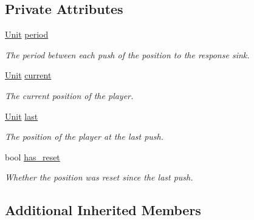 \subsection*{Private Attributes}
\begin{DoxyCompactItemize}
\item 
\hypertarget{classPlayerPosition_a59fceae86a59fb8ad1fb4e93160f948c}{\hyperlink{classPlayerPosition_a535c99057ceca21d8fbe82883c592a66}{Unit} \hyperlink{classPlayerPosition_a59fceae86a59fb8ad1fb4e93160f948c}{period}}\label{classPlayerPosition_a59fceae86a59fb8ad1fb4e93160f948c}

\begin{DoxyCompactList}\small\item\em The period between each push of the position to the response sink. \end{DoxyCompactList}\item 
\hypertarget{classPlayerPosition_a043f477d249cca2eaa00e0e616888bea}{\hyperlink{classPlayerPosition_a535c99057ceca21d8fbe82883c592a66}{Unit} \hyperlink{classPlayerPosition_a043f477d249cca2eaa00e0e616888bea}{current}}\label{classPlayerPosition_a043f477d249cca2eaa00e0e616888bea}

\begin{DoxyCompactList}\small\item\em The current position of the player. \end{DoxyCompactList}\item 
\hypertarget{classPlayerPosition_a4adeb717201c469c16236c2d2d6f9cef}{\hyperlink{classPlayerPosition_a535c99057ceca21d8fbe82883c592a66}{Unit} \hyperlink{classPlayerPosition_a4adeb717201c469c16236c2d2d6f9cef}{last}}\label{classPlayerPosition_a4adeb717201c469c16236c2d2d6f9cef}

\begin{DoxyCompactList}\small\item\em The position of the player at the last push. \end{DoxyCompactList}\item 
bool \hyperlink{classPlayerPosition_a876749ea389ec23a8af6fe26e3e13883}{has\+\_\+reset}
\begin{DoxyCompactList}\small\item\em Whether the position was reset since the last push. \end{DoxyCompactList}\end{DoxyCompactItemize}
\subsection*{Additional Inherited Members}


